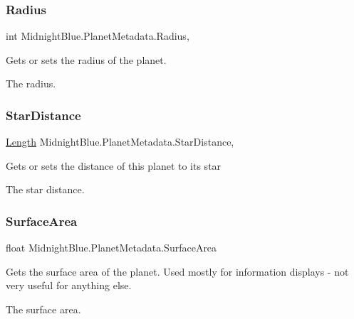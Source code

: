 \subsubsection{\texorpdfstring{Radius}{Radius}}
{\footnotesize\ttfamily int Midnight\+Blue.\+Planet\+Metadata.\+Radius\hspace{0.3cm}{\ttfamily [get]}, {\ttfamily [set]}}



Gets or sets the radius of the planet. 

The radius.\hypertarget{class_midnight_blue_1_1_planet_metadata_a64e2d5e667ebf1d04a031ded2f68a718}{}\label{class_midnight_blue_1_1_planet_metadata_a64e2d5e667ebf1d04a031ded2f68a718} 
\subsubsection{\texorpdfstring{Star\+Distance}{StarDistance}}
{\footnotesize\ttfamily \hyperlink{class_midnight_blue_1_1_length}{Length} Midnight\+Blue.\+Planet\+Metadata.\+Star\+Distance\hspace{0.3cm}{\ttfamily [get]}, {\ttfamily [set]}}



Gets or sets the distance of this planet to its star 

The star distance.\hypertarget{class_midnight_blue_1_1_planet_metadata_a3fde09dbb0d471d2d50020f73089b475}{}\label{class_midnight_blue_1_1_planet_metadata_a3fde09dbb0d471d2d50020f73089b475} 
\subsubsection{\texorpdfstring{Surface\+Area}{SurfaceArea}}
{\footnotesize\ttfamily float Midnight\+Blue.\+Planet\+Metadata.\+Surface\+Area\hspace{0.3cm}{\ttfamily [get]}}



Gets the surface area of the planet. Used mostly for information displays -\/ not very useful for anything else. 

The surface area.\hypertarget{class_midnight_blue_1_1_planet_metadata_a6902b9cd6ac9400696c6aaa74a52821f}{}\label{class_midnight_blue_1_1_planet_metadata_a6902b9cd6ac9400696c6aaa74a52821f} 
